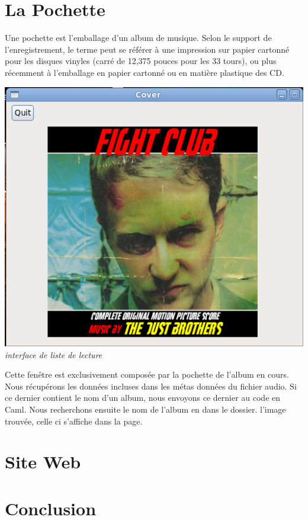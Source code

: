 \documentclass[12pt,a4paper]{report}
\begin{document}
\chapter{La Pochette}

Une pochette est l'emballage d'un album de musique. Selon le support de l'enregistrement, le terme peut se référer à une impression sur papier cartonné pour les disques vinyles (carré de 12,375 pouces pour les 33 tours), ou plus récemment à l'emballage en papier cartonné ou en matière plastique des CD.

\begin{center}
\includegraphics[scale=0.7]{cover.png}
\it{interface de liste de lecture}
\end{center}

Cette fenêtre est exclusivement composée par la pochette de l'album en cours.
Nous récupérons les données incluses dans les métas données du fichier audio. 
Si ce dernier contient le nom d'un album, nous envoyons ce dernier au code en Caml. 
Nous recherchons ensuite le nom de l'album en dans le dossier. l'image trouvée, celle ci s'affiche dans la page.

\chapter{Site Web}


\chapter*{Conclusion}
\end{document}
